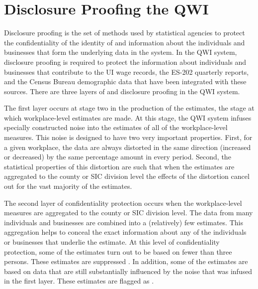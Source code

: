 \section{Disclosure Proofing the QWI}
\label{sec:confidentiality}


Disclosure proofing is the set of methods used by statistical agencies to
protect the confidentiality of the identity of and information about the
individuals and businesses that form the underlying data in the system. In
the QWI system, disclosure proofing is required to protect the information
about individuals and businesses that contribute to the UI wage
records, the ES-202 quarterly reports, and the Census Bureau demographic
data that have been integrated with these sources. There are three layers of %
 and disclosure proofing in the QWI
system.

The first layer occurs at stage two in the production of the estimates, the
stage at which workplace-level estimates are made. At this stage, the QWI
system infuses specially constructed noise into the estimates of all of the
workplace-level measures. This noise is designed to have two very
important properties. First, for a given workplace, the data are always
distorted in the same direction (increased or decreased) by the same
percentage amount in every period. Second, the statistical properties%
 of this distortion are such that
when the estimates are aggregated to the county or SIC
division level the effects of the distortion cancel out for the vast
majority of the estimates.

The second layer of confidentiality protection occurs when the
workplace-level measures are aggregated to the county or SIC
division level. The data from many individuals and businesses are combined
into a (relatively) few estimates. This aggregation helps to conceal the
exact information about any of the individuals or businesses that underlie
the estimate. At this level of confidentiality protection, some of the
estimates turn out to be based on fewer than three persons. These estimates
are suppressed%
. In addition, some of the estimates are based on data
that are still substantially influenced by the noise that was infused in the
first layer. These estimates are flagged as .

